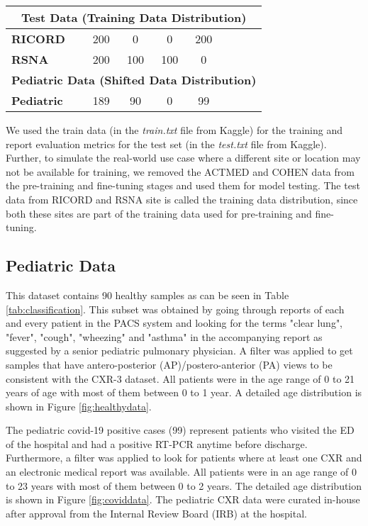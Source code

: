 \documentclass[10pt,journal,compsoc]{IEEEtran}
\newcommand{\cmark}{\ding{51}}\newcommand{\xmark}{\ding{55}}
\begin{document}
\begin{table*}[ht]
\begin{center}
{\begin{tabular}{|l|c|c|c|c|c|c|c|}
\multicolumn{8}{|c|}{\textbf{Test Data (Training Data Distribution)}}                              \\ \hline \hline
\textbf{RICORD}     & 200   & 0    & 0    & 200   & \xmark  & \xmark  & \cmark \\
\textbf{RSNA}       & 200   & 100  & 100  & 0     & \xmark  & \xmark  & \cmark \\ \hline \hline
\multicolumn{8}{|c|}{\textbf{Pediatric Data (Shifted Data Distribution)}}                            \\ \hline
\textbf{Pediatric}           & 189   & 90  & 0    & 99   & \xmark  & \cmark  & \cmark  \\ \hline
\end{tabular}
}
\end{center}
\end{table*}



We used the train data (in the \textit{train.txt} file from Kaggle) for the training and report evaluation metrics for the test set (in the \textit{test.txt} file from Kaggle). Further, to simulate the real-world use case where a different site or location may not be available for training, we removed the ACTMED\cite{actmed} and COHEN\cite{cohen} data from the pre-training and fine-tuning stages and used them for model testing. The test data from RICORD and RSNA site is called the training data distribution, since both these sites are part of the training data used for pre-training and fine-tuning. 


\subsection{Pediatric Data}\label{section:cnhdataset}
This dataset contains 90 healthy samples as can be seen in Table \ref{tab:classification}. This subset was obtained by going through reports of each and every patient in the PACS system and looking for the terms "clear lung", "fever", "cough", "wheezing" and "asthma" in the accompanying report as suggested by a senior pediatric pulmonary physician. A filter was applied to get samples that have antero-posterior (AP)/postero-anterior (PA) views to be consistent with the CXR-3 dataset. All patients were in the age range of 0 to 21 years of age with most of them between 0 to 1 year. A detailed age distribution is shown in Figure \ref{fig:healthydata}.

The pediatric covid-19 positive cases (99) represent patients who visited the ED of the hospital and had a positive RT-PCR anytime before discharge. Furthermore, a filter was applied to look for patients where at least one CXR and an electronic medical report was available. All patients were in an age range of 0 to 23 years with most of them between 0 to 2 years. The detailed age distribution is shown in Figure \ref{fig:coviddata}. The pediatric CXR data were curated in-house after approval from the Internal Review Board (IRB) at the hospital.
\end{document}
